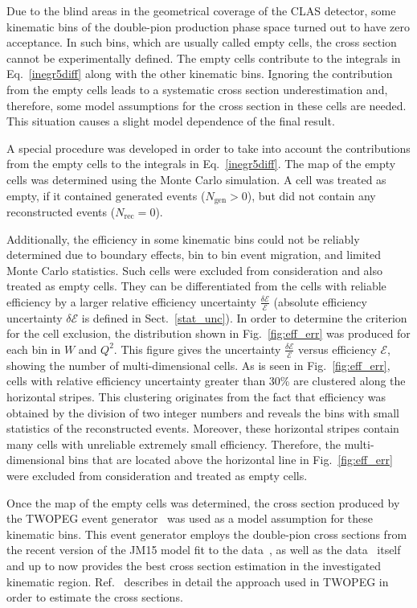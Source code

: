 \documentclass[prc,twocolumn,superscriptaddress,showpacs,amssymb,amsmath,amsfonts,aps,nofootinbib]{revtex4-1}
\begin{document}
Due to the blind areas in the geometrical coverage of the CLAS detector, some kinematic bins of the double-pion production phase space turned out to have zero acceptance. 
In such bins, which are usually called empty cells,  the cross section cannot be experimentally defined. The empty cells contribute to the integrals in Eq.~\eqref{inegr5diff} along with the other kinematic bins.  Ignoring the contribution from the empty cells leads to a systematic cross section underestimation and, therefore, some model assumptions for the cross section in these cells are needed. This situation causes a slight model dependence of the final result. 

A special procedure was developed in order to take into account the contributions from the empty cells to the integrals in Eq.~\eqref{inegr5diff}.
The map of the empty cells was determined using the Monte Carlo simulation. A cell was treated as empty, if it contained generated events ($N_{\text{gen}} > 0$), but did not contain any reconstructed events ($N_{\text{rec}} = 0$). 

Additionally, the efficiency in some kinematic bins could not be reliably determined due to boundary effects, bin to bin event migration, and limited Monte Carlo statistics.  
Such cells were excluded from consideration and also treated as empty cells.
They can be differentiated from the cells with reliable efficiency by a larger relative efficiency uncertainty $\frac{\delta \mathcal{E}}{\mathcal{E}}$ (absolute efficiency uncertainty $\delta \mathcal{E}$ is defined in Sect.~\ref{stat_unc}).
In order to determine the criterion for the cell exclusion, the distribution shown in Fig.~\ref{fig:eff_err} was produced for each bin in $W$ and $Q^{2}$.
This figure gives the uncertainty $\frac{\delta \mathcal{E}}{\mathcal{E}}$   versus efficiency $\mathcal{E}$, showing the number of multi-dimensional cells. As is seen in  Fig.~\ref{fig:eff_err}, cells with relative efficiency uncertainty greater than 30\% are clustered along the horizontal stripes. This clustering originates from the fact that efficiency was obtained by the division of two integer numbers and reveals the bins with small statistics of the reconstructed events. Moreover, these horizontal stripes contain many cells with unreliable extremely small efficiency. Therefore,  the multi-dimensional bins that are located above the horizontal  line in Fig.~\ref{fig:eff_err} were excluded from consideration and treated as empty cells.



Once the map of the empty cells was determined, the cross section produced by the TWOPEG event  generator~\cite{Skorodum:EG} was used as a model assumption for these kinematic bins. This event generator employs the double-pion cross sections from the recent version of the JM15 model fit to the data~\cite{Ripani:2002ss,Mokeev:2012vsa,Fedotov:2008aa,Golovach:note}, as well as the data~\cite{Wu:2005wf,ABBHHM:1968aa} itself and up to now provides the best cross section estimation in the investigated kinematic region.
Ref.~\cite{Skorodum:EG} describes in detail the approach used in TWOPEG in order to estimate the cross sections. 
\end{document}
